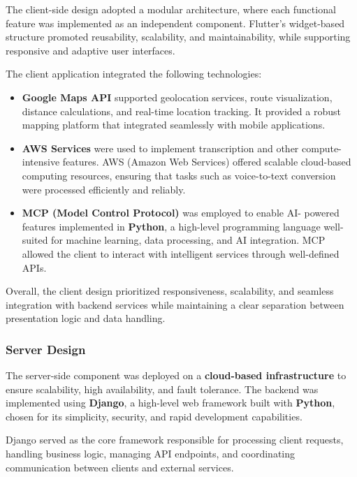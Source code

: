 The client-side design adopted a modular architecture, where each functional
feature was implemented as an independent component. Flutter’s widget-based
structure promoted reusability, scalability, and maintainability, while
supporting responsive and adaptive user interfaces.


The client application integrated the following technologies:


\begin{itemize}
 \item \textbf{Google Maps API} supported geolocation services, route
        visualization, distance calculations, and real-time location tracking.
        It provided a robust mapping platform that integrated seamlessly with
        mobile applications.

 \item \textbf{AWS Services} were used to implement transcription and
        other compute-intensive features. AWS (Amazon Web Services) offered
        scalable cloud-based computing resources, ensuring that tasks such as
        voice-to-text conversion were processed efficiently and reliably.

 \item \textbf{MCP (Model Control Protocol)} was employed to enable AI-
        powered features implemented in \textbf{Python}, a high-level
        programming language well-suited for machine learning, data processing,
        and AI integration. MCP allowed the client to interact with intelligent
        services through well-defined APIs.
\end{itemize}

Overall, the client design prioritized responsiveness, scalability, and seamless
integration with backend services while maintaining a clear separation between
presentation logic and data handling.


\subsubsection{Server Design}

The server-side component was deployed on a \textbf{cloud-based infrastructure}
to ensure scalability, high availability, and fault tolerance. The backend was
implemented using \textbf{Django}, a high-level web framework built with
\textbf{Python}, chosen for its simplicity, security, and rapid development
capabilities.


Django served as the core framework responsible for processing client requests,
handling business logic, managing API endpoints, and coordinating communication
between clients and external services.


